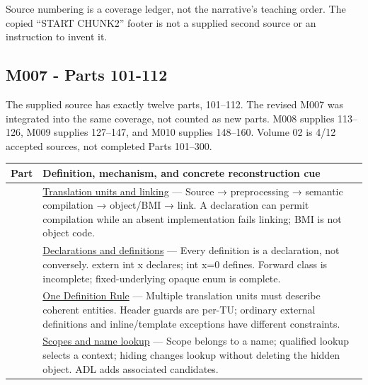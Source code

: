 Source numbering is a coverage ledger, not the narrative's teaching order. The copied ``START CHUNK2'' footer is not a supplied second source or an instruction to invent it.

\subsection{M007 - Parts 101-112}\label{appendix-fd090d982a15-m007---parts-101-112}

The supplied source has exactly twelve parts, 101--112. The revised M007 was integrated into the same coverage, not counted as new parts. M008 supplies 113--126, M009 supplies 127--147, and M010 supplies 148--160. Volume 02 is 4/12 accepted sources, not completed Parts 101--300.

{\def\LTcaptype{none} %
\begin{longtable}[]{@{}
  >{\raggedright\arraybackslash}p{}
  >{\raggedright\arraybackslash}p{}@{}}
\toprule\noalign{}
\begin{minipage}[b]{\linewidth}\raggedright
Part
\end{minipage} & \begin{minipage}[b]{\linewidth}\raggedright
Definition, mechanism, and concrete reconstruction cue
\end{minipage} \\
\midrule\noalign{}
\endhead
\bottomrule\noalign{}
\endlastfoot
101 & \hyperref[appendix-806686359e1b]{Translation units and linking} --- Source → preprocessing → semantic compilation → object/BMI → link. A declaration can permit compilation while an absent implementation fails linking; BMI is not object code. \\
102 & \hyperref[appendix-2e4d494c2d94]{Declarations and definitions} --- Every definition is a declaration, not conversely. extern int x declares; int x=0 defines. Forward class is incomplete; fixed-underlying opaque enum is complete. \\
103 & \hyperref[appendix-49d27bc9d9a5]{One Definition Rule} --- Multiple translation units must describe coherent entities. Header guards are per-TU; ordinary external definitions and inline/template exceptions have different constraints. \\
104 & \hyperref[appendix-b12b31759da1]{Scopes and name lookup} --- Scope belongs to a name; qualified lookup selects a context; hiding changes lookup without deleting the hidden object. ADL adds associated candidates. \\

\end{longtable}}
